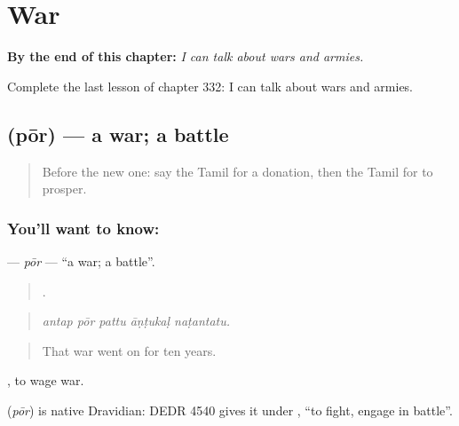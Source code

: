 
\chapter{War}
\label{ch:ta-war}

\begin{chapteropening}
\textbf{By the end of this chapter:} \emph{I can talk about wars and armies.}

Complete the last lesson of chapter 332: I can talk about wars and armies.
\end{chapteropening}

\section[\texorpdfstring{\ta{போர்} (pōr)}{போர் (pōr)}]{ (pōr) — a war; a battle}

\label{lesson:TA-C332-por}



\begin{quote}
Before the new one: say the Tamil for a donation, then the Tamil for to prosper.
\end{quote}

\subsection*{You'll want to know: }
\textbf{} — \emph{pōr} — \textquotedblleft{}a war; a battle\textquotedblright{}.

\begin{quote}
    .
\end{quote}

\begin{quote}
\emph{antap pōr pattu āṇṭukaḷ naṭantatu.}
\end{quote}

\begin{quote}
That war went on for ten years.
\end{quote}

 , to wage war.

\begin{cousinweb}
\textbf{} (\emph{pōr}) is native Dravidian: DEDR 4540 gives it under , \textquotedblleft{}to fight, engage in battle\textquotedblright{}.
\end{cousinweb}

